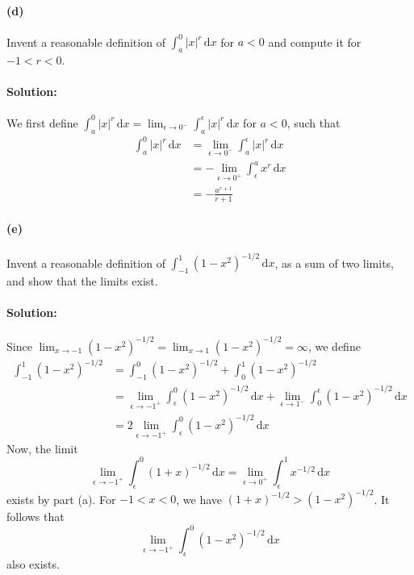 \documentclass{article}
\begin{document}
\paragraph{(d)} Invent a reasonable definition of $\int_a^0 |x|^r
\,\mathrm{d}x$ for $a < 0$ and compute it for $-1 < r < 0$.

\paragraph{Solution:} We first define $\int_a^0 |x|^r \,\mathrm{d}x =
\lim_{\epsilon \rightarrow 0^-} \int_a^{\epsilon} |x|^r \,\mathrm{d}x$ for $a <
0$, such that \begin{align*}
  \int_a^0 |x|^r \,\mathrm{d}x
  &= \lim_{\epsilon \rightarrow 0^-} \int_a^{\epsilon} |x|^r \,\mathrm{d}x \\
  &= -\lim_{\epsilon \rightarrow 0^+} \int_{\epsilon}^a x^r \,\mathrm{d}x \\
  &= -\frac{a^{r + 1}}{r + 1}
\end{align*}

\paragraph{(e)} Invent a reasonable definition of $\int_{-1}^1 (1 - x^2)^{-1/2}
\,\mathrm{d}x$, as a sum of two limits, and show that the limits exist.

\paragraph{Solution:} Since $\lim_{x \rightarrow -1} (1 - x^2)^{-1/2} =
\lim_{x \rightarrow 1} (1 - x^2)^{-1/2} = \infty$, we define \begin{align*}
  \int_{-1}^1 (1 - x^2)^{-1/2}
  &= \int_{-1}^0 (1 - x^2)^{-1/2} + \int_0^1 (1 - x^2)^{-1/2} \\
  &= \lim_{\epsilon \rightarrow -1^+} \int_{\epsilon}^0 (1 - x^2)^{-1/2}
    \,\mathrm{d}x
    + \lim_{\epsilon \rightarrow 1^-} \int_0^{\epsilon} (1 - x^2)^{-1/2}
    \,\mathrm{d}x \\
  &= 2\lim_{\epsilon \rightarrow -1^+} \int_{\epsilon}^0 (1 - x^2)^{-1/2}
    \,\mathrm{d}x
\end{align*} Now, the limit \begin{equation*}
  \lim_{\epsilon \rightarrow -1^+} \int_{\epsilon}^0 (1 + x)^{-1/2}
  \,\mathrm{d}x = \lim_{\epsilon \rightarrow 0^+} \int_{\epsilon}^1 x^{-1/2}
  \,\mathrm{d}x
\end{equation*} exists by part (a). For $-1 < x < 0$, we have $(1 + x)^{-1/2} >
(1 - x^2)^{-1/2}$. It follows that \begin{equation*}
  \lim_{\epsilon \rightarrow -1^+} \int_{\epsilon}^0 (1 - x^2)^{-1/2}
    \,\mathrm{d}x
\end{equation*} also exists.
\end{document}

